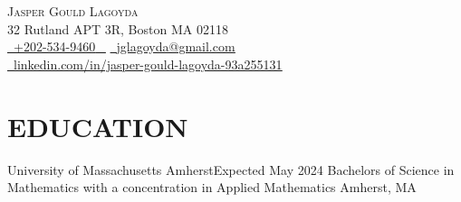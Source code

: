 \documentclass[letterpaper,11pt]{article}
\begin{document}


\begin{center}
     {\Huge \scshape Jasper Gould Lagoyda} \\ \vspace{1pt}
    32 Rutland  APT 3R, Boston MA 02118 \\ \vspace{1pt}
    \small \href{tel:+xxxxxxxxxxxx}{ \raisebox{-0.1\height}\faPhone\ \underline{+202-534-9460} ~} \href{mailto:yourname@gmail.com}{\raisebox{-0.2\height}\faEnvelope\   \underline{jglagoyda@gmail.com}} ~ \\ 
    \href{linkedin.com/in/jasper-gould-lagoyda-93a255131}{\raisebox{-0.2\height}\faLinkedinSquare\ \underline{linkedin.com/in/jasper-gould-lagoyda-93a255131}}  ~
    \vspace{-8pt}
\end{center}
\section{EDUCATION}
\resumeSubHeadingListStart
    \resumeSubheading
      {University of Massachusetts Amherst}{Expected May 2024}
      { Bachelors of Science in Mathematics with a concentration in Applied Mathematics 
      } {Amherst, MA} 
  \resumeSubHeadingListEnd
  
 

\end{document}
